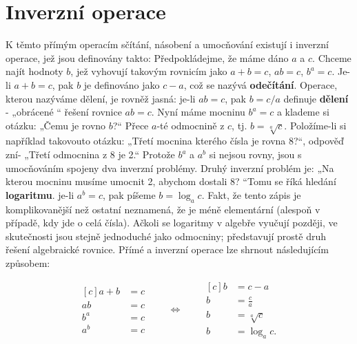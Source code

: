   \section{Inverzní operace}\label{fyz:IchapXXIIsecII}
    K těmto přímým operacím sčítání, násobení a umocňování existují i inverzní operace, jež jsou
    deﬁnovány takto: Předpokládejme, že máme dáno \(a\) a \(c\). Chceme najít hodnoty \(b\), jež
    vyhovují takovým rovnicím jako \(a + b = c\), \(ab = c\), \(b^a = c\). Je-li \(a + b = c\), pak
    \(b\) je definováno jako \(c - a\), což se nazývá \textbf{odečítání}. Operace, kterou nazýváme
    dělení, je rovněž jasná: je-li \(ab = c\), pak \(b = c/a\) definuje \textbf{dělení} - „obrácené
    “ řešení rovnice \(ab = c\). Nyní máme mocninu \(b^a = c\) a klademe si otázku: „Čemu je rovno
    \(b\)?“ Přece \(a\)-té odmocnině z \(c\), tj. \(b = \sqrt[a]{c}\). Položíme-li si například
    takovouto otázku: „Třetí mocnina kterého čísla je rovna 8?“, odpověď zní- „Třetí odmocnina z 8
    je 2.“ Protože \(b^a\) a \(a^b\) si nejsou rovny, jsou s umocňováním spojeny dva inverzní
    problémy. Druhý inverzní problém je: „Na kterou mocninu musíme umocnit 2, abychom dostali 8?
    “Tomu se říká hledání \textbf{logaritmu}. je-li \(a^b = c\), pak píšeme \(b=\log_ac\). Fakt, že
    tento zápis je komplikovanější než ostatní neznamená, že je méně elementární (alespoň v případě,
    kdy jde o celá čísla). Ačkoli se logaritmy v algebře vyučují později, ve skutečnosti jsou stejně
    jednoduché jako odmocniny; představují prostě druh řešení algebraické rovnice. Přímé a inverzní
    operace lze shrnout následujícím způsobem:

    \begin{equation}\label{fyz:eq648}
      \begin{aligned}[c]
        a + b &= c  \\[0.5em]
        ab    &= c  \\[0.5em]
        b^a   &= c  \\
        a^b   &= c  
      \end{aligned}
        \qquad\Longleftrightarrow\qquad
      \begin{aligned}[c]
            b &= c -a         \\
            b &= \frac{c}{a}  \\
            b &= \sqrt[a]{c}  \\
            b &= \log_ac.  
      \end{aligned}
    \end{equation}
   
